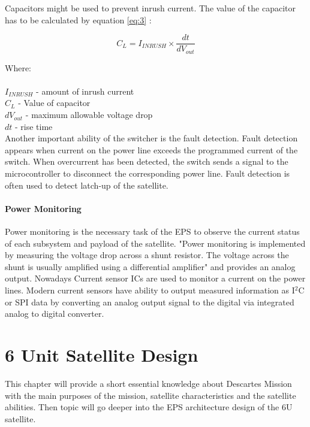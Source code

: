  Capacitors might be used to prevent inrush current. The value of the capacitor has to be calculated by equation \ref{eq:3} \cite{32}:
 
 \begin{equation}\label{eq:3}
 C_{L} = I_{INRUSH} \times \dfrac{dt}{dV_{out}}
 \end{equation}
 
 Where:\\ \\
 $I_{INRUSH}$ - amount of inrush current\\
 $C_{L}$ - Value of capacitor \\
 $dV_{out}$ - maximum allowable voltage drop\\
 $dt$ - rise time\\

Another important ability of the switcher is the fault detection. Fault detection appears when current on the power line exceeds the programmed current of the switch. When overcurrent has been detected, the switch sends a signal to the microcontroller to disconnect the corresponding power line. Fault detection is often used to detect latch-up of the satellite.\\

\subsubsection{Power Monitoring}

Power monitoring is the necessary task of the EPS to observe the current status of each subsystem and payload of the satellite. \cite{22} "Power monitoring is implemented by measuring the voltage drop across a shunt resistor.  The voltage across the shunt  is  usually  amplified  using  a  differential amplifier" and  provides an analog output. Nowadays Current sensor ICs are used to monitor a current on the power lines. Modern current sensors have ability to output measured information as I$^{2}$C or SPI data by converting an analog output signal to the digital via integrated analog to digital converter. 

 
\chapter{6 Unit Satellite Design \label{chapter3}}
This chapter will provide a short essential knowledge about Descartes Mission with the main purposes of the mission, satellite characteristics and the satellite  abilities. Then topic will go deeper into the EPS architecture design of the 6U satellite. \\
